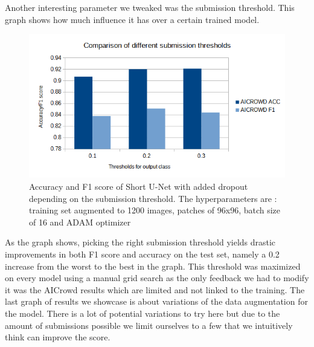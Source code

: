 \documentclass[10pt,conference,compsocconf]{IEEEtran}
\begin{document}
\newline
Another interesting parameter we tweaked was the submission threshold. This graph shows how much influence it has over a certain trained model.
\begin{figure}[H]
    \centering
    \includegraphics[scale = 0.4]{thresholds_graph.png} %
    \caption{Accuracy and F1 score of Short U-Net with added dropout depending on the submission threshold. The hyperparameters are : training set augmented to 1200 images, patches of 96x96, batch size of 16 and ADAM optimizer}
\end{figure}
As the graph shows, picking the right submission threshold yields drastic improvements in both F1 score and accuracy on the test set, namely a 0.2 increase from the worst to the best in the graph. This threshold was maximized on every model using a manual grid search as the only feedback we had to modify it was the AICrowd results which are limited and not linked to the training.
\newline
\label{results_data}
The last graph of results we showcase is about variations of the data augmentation for the model. There is a lot of potential variations to try here but due to the amount of submissions possible we limit ourselves to a few that we intuitively think can improve the score.
\end{document}

